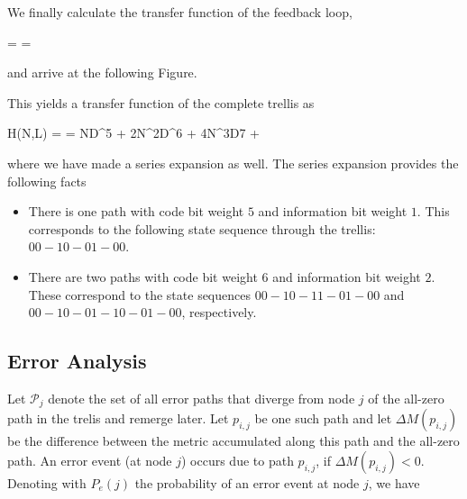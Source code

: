 We finally calculate the transfer function of the feedback loop,

\bee
{} =  = 
\eee

 and arrive at the following Figure.

\vspace*{7mm}


This yields a transfer function of the complete trellis as

\bee
H(N,L) =  = ND^5 + 2N^2D^6 + 4N^3D7 + \cdots
\eee

where we have made a series expansion as well. The series expansion provides the following facts

\begin{itemize}

\item There is one path with code bit weight $5$ and information bit weight $1$. This corresponds to the following state sequence through the trellis: $00-10-01-00$.

\item  There are two paths with code bit weight $6$ and information bit weight $2$. These correspond to the state sequences $00-10-11-01-00$ and $00-10-01-10-01-00$, respectively.

\end{itemize}

\subsection{Error Analysis}

Let $\mathcal{P}_j$ denote the set of all error paths that diverge from node $j$ of the all-zero path in the trelis and remerge later. Let $p_{i,j}$ be one such path and let $\Delta M(p_{i,j})$ be the difference between the metric accumulated along this path and the all-zero path. An error event (at node $j$) occurs due to path $p_{i,j}$, if $\Delta M(p_{i,j}) < 0$. Denoting with $P_e(j)$ the probability of an error event at node $j$, we have

